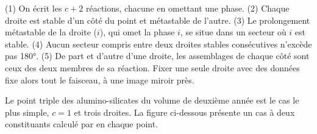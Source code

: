 \begin{method}\label{met:b3:petrological-thermodynamics:schreinemakers}
(1) On écrit les $c + 2$ réactions, chacune en omettant une phase. (2) Chaque droite est
stable d'un côté du point et métastable de l'autre. (3) Le
prolongement métastable de la droite ($i$), qui omet la phase $i$, se situe dans un
secteur où $i$ est stable. (4) Aucun secteur compris entre deux droites stables consécutives
n'excède pas \ang{180}. (5) De part et d'autre d'une droite, les assemblages
de chaque côté sont ceux des deux membres de sa réaction. Fixer une seule droite avec des données
fixe alors tout le faisceau, à une image miroir près.
\end{method}

Le point triple des alumino-silicates du volume de deuxième année est le cas le plus simple,
$c = 1$ et trois droites. La figure ci-dessous présente un cas à deux constituants
calculé par  en chaque point.

